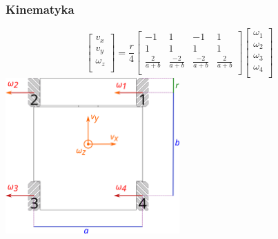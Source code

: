 \documentclass{beamer}
\begin{document}
	\begin{frame}
		\frametitle{Kinematyka}
		\[
		\begin{bmatrix}
		v_x \\
		v_y \\
		\omega_z \\
		\end{bmatrix}
		=
		\frac{r}{4}
		\begin{bmatrix}
		-1 & 1 & -1 & 1 \\
		1 & 1 & 1 & 1 \\
		\frac{2}{a+b} & \frac{-2}{a+b} & \frac{-2}{a+b} & \frac{2}{a+b} \\
		\end{bmatrix}
		\begin{bmatrix}
		\omega_1 \\
		\omega_2 \\
		\omega_3 \\
		\omega_4 \\
		\end{bmatrix}
		\]
		\centering
		\includegraphics[width=0.5\textwidth]{graphics/base_dims.pdf} 
	\end{frame}
\end{document}
